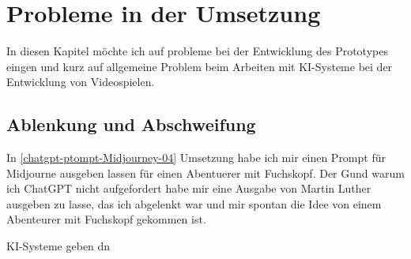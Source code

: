 \chapter{Probleme in der Umsetzung}
In diesen Kapitel möchte ich auf probleme bei der Entwicklung des Prototypes eingen und kurz auf allgemeine Problem beim Arbeiten mit KI-Systeme bei der Entwicklung von Videospielen.

\section{Ablenkung und Abschweifung}
In \ref{chatgpt-ptompt-Midjourney-04} Umsetzung habe ich mir einen Prompt für Midjourne ausgeben lassen für einen Abentuerer mit Fuchskopf. Der Gund warum ich ChatGPT nicht aufgefordert habe mir eine Ausgabe von Martin Luther ausgeben zu lasse, das ich abgelenkt war und mir spontan die Idee von einem Abenteurer mit Fuchskopf gekommen ist.

KI-Systeme geben dn
